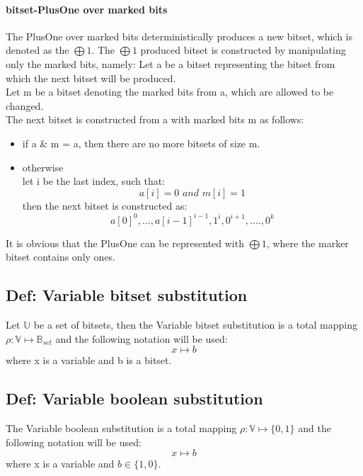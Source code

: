 \documentclass{article}
\begin{document}
			\paragraph{bitset-PlusOne over marked bits}
			The PlusOne over marked bits deterministically produces a new bitset, which is denoted as the $\bigoplus 1$.
			The $\bigoplus 1$ produced bitset is constructed by manipulating only the marked bits, namely:
			Let a be a bitset representing the bitset from which the next bitset will be produced. \\
			Let m be a bitset denoting the marked bits from a, which are allowed to be changed. \\
			The next bitset is constructed from a with marked bits m as follows:
			\begin{itemize}
				\item if a \& m = a, then there are no more bitsets of size m.
				\item otherwise \\ 
					let i be the last index, such that:
					\begin{equation}
						a[i] =0 \textit{  and  } m[i] = 1
					\end{equation}
					then the next bitset is constructed as: 
					\begin{equation}
						a[0]^0, ..., a[i-1]^{i-1}, 1^i, 0^{i+1}, ...., 0^k
					\end{equation}
			\end{itemize}

			It is obvious that the PlusOne can be represented with $\bigoplus 1$, where the marker bitset contains only ones.

	\subsection*{Def: Variable bitset substitution}
		Let $\mathbb{U}$ be a set of bitsets, then the Variable bitset substitution is a total mapping 
		 $\rho : \mathbb{V} \longmapsto \mathbb{B}_{set}$ and the following notation will be used:
		\begin{equation}
			x \longmapsto b
		\end{equation}
		where x is a variable and b is a bitset.
	\subsection*{Def: Variable boolean substitution}
		The Variable boolean substitution is a total mapping 
		 $\rho : \mathbb{V} \longmapsto \{0, 1\}$ and the following notation will be used:
		\begin{equation}
			x \longmapsto b
		\end{equation}
		where x is a variable and $b \in \{ 1, 0 \}$.
\end{document}
